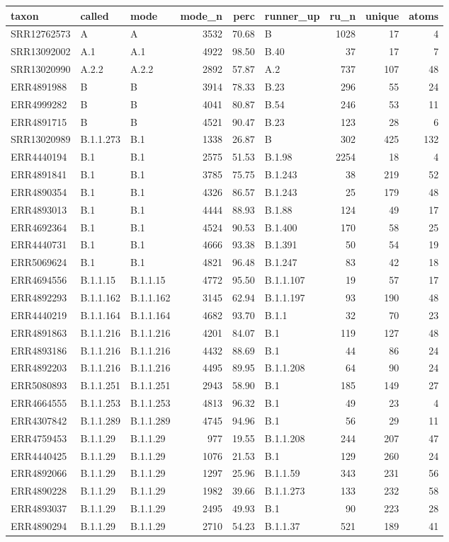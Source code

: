 \documentclass[
]{article}
\begin{document}
\begin{longtable}[]{@{}lllrrlrrr@{}}
\toprule
taxon & called & mode & mode\_n & perc & runner\_up & ru\_n & unique &
atoms\tabularnewline
\midrule
\endhead
SRR12762573 & A & A & 3532 & 70.68 & B & 1028 & 17 & 4\tabularnewline
SRR13092002 & A.1 & A.1 & 4922 & 98.50 & B.40 & 37 & 17 &
7\tabularnewline
SRR13020990 & A.2.2 & A.2.2 & 2892 & 57.87 & A.2 & 737 & 107 &
48\tabularnewline
ERR4891988 & B & B & 3914 & 78.33 & B.23 & 296 & 55 & 24\tabularnewline
ERR4999282 & B & B & 4041 & 80.87 & B.54 & 246 & 53 & 11\tabularnewline
ERR4891715 & B & B & 4521 & 90.47 & B.23 & 123 & 28 & 6\tabularnewline
SRR13020989 & B.1.1.273 & B.1 & 1338 & 26.87 & B & 302 & 425 &
132\tabularnewline
ERR4440194 & B.1 & B.1 & 2575 & 51.53 & B.1.98 & 2254 & 18 &
4\tabularnewline
ERR4891841 & B.1 & B.1 & 3785 & 75.75 & B.1.243 & 38 & 219 &
52\tabularnewline
ERR4890354 & B.1 & B.1 & 4326 & 86.57 & B.1.243 & 25 & 179 &
48\tabularnewline
ERR4893013 & B.1 & B.1 & 4444 & 88.93 & B.1.88 & 124 & 49 &
17\tabularnewline
ERR4692364 & B.1 & B.1 & 4524 & 90.53 & B.1.400 & 170 & 58 &
25\tabularnewline
ERR4440731 & B.1 & B.1 & 4666 & 93.38 & B.1.391 & 50 & 54 &
19\tabularnewline
ERR5069624 & B.1 & B.1 & 4821 & 96.48 & B.1.247 & 83 & 42 &
18\tabularnewline
ERR4694556 & B.1.1.15 & B.1.1.15 & 4772 & 95.50 & B.1.1.107 & 19 & 57 &
17\tabularnewline
ERR4892293 & B.1.1.162 & B.1.1.162 & 3145 & 62.94 & B.1.1.197 & 93 & 190
& 48\tabularnewline
ERR4440219 & B.1.1.164 & B.1.1.164 & 4682 & 93.70 & B.1.1 & 32 & 70 &
23\tabularnewline
ERR4891863 & B.1.1.216 & B.1.1.216 & 4201 & 84.07 & B.1 & 119 & 127 &
48\tabularnewline
ERR4893186 & B.1.1.216 & B.1.1.216 & 4432 & 88.69 & B.1 & 44 & 86 &
24\tabularnewline
ERR4892203 & B.1.1.216 & B.1.1.216 & 4495 & 89.95 & B.1.1.208 & 64 & 90
& 24\tabularnewline
ERR5080893 & B.1.1.251 & B.1.1.251 & 2943 & 58.90 & B.1 & 185 & 149 &
27\tabularnewline
ERR4664555 & B.1.1.253 & B.1.1.253 & 4813 & 96.32 & B.1 & 49 & 23 &
4\tabularnewline
ERR4307842 & B.1.1.289 & B.1.1.289 & 4745 & 94.96 & B.1 & 56 & 29 &
11\tabularnewline
ERR4759453 & B.1.1.29 & B.1.1.29 & 977 & 19.55 & B.1.1.208 & 244 & 207 &
47\tabularnewline
ERR4440425 & B.1.1.29 & B.1.1.29 & 1076 & 21.53 & B.1 & 129 & 260 &
24\tabularnewline
ERR4892066 & B.1.1.29 & B.1.1.29 & 1297 & 25.96 & B.1.1.59 & 343 & 231 &
56\tabularnewline
ERR4890228 & B.1.1.29 & B.1.1.29 & 1982 & 39.66 & B.1.1.273 & 133 & 232
& 58\tabularnewline
ERR4893037 & B.1.1.29 & B.1.1.29 & 2495 & 49.93 & B.1 & 90 & 223 &
28\tabularnewline
ERR4890294 & B.1.1.29 & B.1.1.29 & 2710 & 54.23 & B.1.1.37 & 521 & 189 &
41\tabularnewline

\end{longtable}
\end{document}
